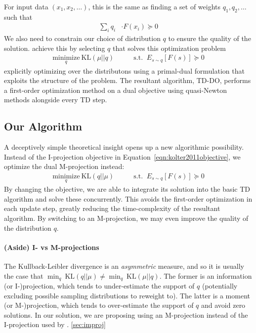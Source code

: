 \documentclass[11pt]{article}
\begin{document}
For input data $(x_1, x_2, \ldots)$, this is the same as finding a set of weights $q_1, q_2, \ldots$ such that
\begin{align}
\sum_i q_i & \cdot F(x_i) \succcurlyeq 0
\end{align}
We also need to constrain our choice of distribution $q$ to ensure the quality of the solution. \citet{kolter2011fixed} achieve this by selecting $q$ that solves this optimization problem
\begin{align}
    \underset{q}{\text{minimize}}~\text{KL}(\mu||q) & \qquad \text{s.t. } ~ E_{s\sim q}[F(s)] \succcurlyeq 0 \label{eqn:kolter2011objective}
\end{align}
explicitly optimizing over the distributons using a primal-dual formulation that exploits the structure of the problem. The resultant algorithm, TD-DO, performs a first-order optimization method on a dual objective using quasi-Newton methods alongside every TD step.

\subsection{Our Algorithm}

A deceptively simple theoretical insight opens up a new algorithmic possibility. Instead of the I-projection objective in Equation~\ref{eqn:kolter2011objective}, we optimize the dual M-projection instead:
\begin{align}
  \underset{q}{\text{minimize}}~\text{KL}(q||\mu) & \qquad \text{s.t. } ~ E_{s\sim q}[F(s)] \succcurlyeq 0 \label{eqn:ouroptobj}
\end{align}
By changing the objective, we are able to integrate its solution into the basic TD algorithm and solve these concurrently. This avoids the first-order optimization in each update step, greatly reducing the time-complexity of the resultant algorithm. By switching to an M-projection, we may even improve the quality of the distribution $q$.

\paragraph{(Aside) I- vs M-projections} The Kullback-Leibler divergence is an \emph{asymmetric} measure, and so it is usually the case that $\min_q~\text{KL}(q||\mu) \neq \min_q~\text{KL}(\mu||q)$. The former is an information (or I-)projection, which tends to under-estimate the support of $q$ (potentially excluding possible sampling distributions to reweight to). The latter is a moment (or M-)projection, which tends to over-estimate the support of $q$ and avoid zero solutions. In our solution, we are proposing using an M-projection instead of the I-projection used by \citet{kolter2011fixed}. \ref{sec:improj}
\end{document}
